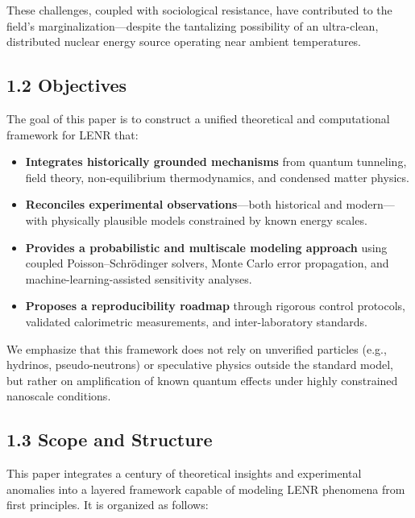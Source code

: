     These challenges, coupled with sociological resistance, have contributed to the field's marginalization—despite the tantalizing possibility of an ultra-clean, distributed nuclear energy source operating near ambient temperatures.
    
    \subsection{1.2 Objectives}
    
    The goal of this paper is to construct a unified theoretical and computational framework for LENR that:
    
    \begin{itemize}
        \item \textbf{Integrates historically grounded mechanisms} from quantum tunneling, field theory, non-equilibrium thermodynamics, and condensed matter physics.
        \item \textbf{Reconciles experimental observations}—both historical and modern—with physically plausible models constrained by known energy scales.
        \item \textbf{Provides a probabilistic and multiscale modeling approach} using coupled Poisson–Schrödinger solvers, Monte Carlo error propagation, and machine-learning-assisted sensitivity analyses.
        \item \textbf{Proposes a reproducibility roadmap} through rigorous control protocols, validated calorimetric measurements, and inter-laboratory standards.
    \end{itemize}
    
    We emphasize that this framework does not rely on unverified particles (e.g., hydrinos, pseudo-neutrons) or speculative physics outside the standard model, but rather on amplification of known quantum effects under highly constrained nanoscale conditions.
    
    \subsection{1.3 Scope and Structure}
    
    This paper integrates a century of theoretical insights and experimental anomalies into a layered framework capable of modeling LENR phenomena from first principles. It is organized as follows:
    
